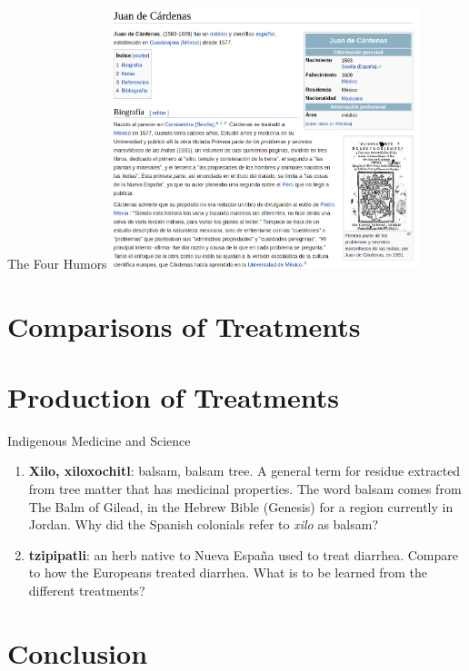 \documentclass{beamer}
\begin{document}
\begin{frame}{The Four Humors}
\includegraphics[width=9cm]{figures/cardenas.png}
\end{frame}

\section{Comparisons of Treatments}

\section{Production of Treatments}


\begin{frame}{Indigenous Medicine and Science}
\small
\begin{enumerate}
\item \textbf{Xilo, xiloxochitl}: balsam, balsam tree.  A general term for residue extracted from tree matter that has medicinal properties.  The word balsam comes from The Balm of Gilead, in the Hebrew Bible (Genesis) for a region currently in Jordan.  Why did the Spanish colonials refer to \textit{xilo} as balsam?
\item \textbf{tzipipatli}: an herb native to Nueva Espa\~{n}a used to treat diarrhea.  Compare to how the Europeans treated diarrhea.  What is to be learned from the different treatments?
\end{enumerate}
\end{frame}

\section{Conclusion}
\end{document}
